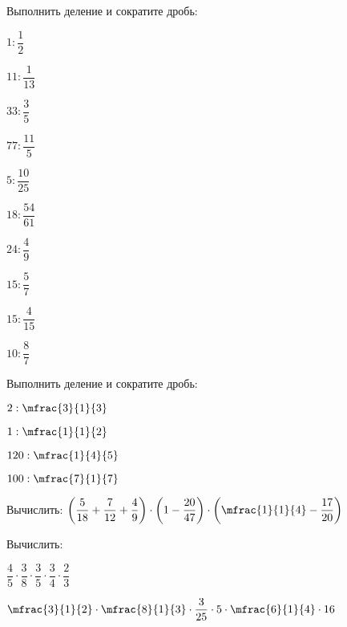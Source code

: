 \begin{listofex}[resume]
	\item Выполнить деление и сократите дробь:
	\begin{enumcols}[itemcolumns=5]
		\item \( 1:\dfrac{1}{2} \)
		\item \( 11:\dfrac{1}{13} \)
		\item \( 33:\dfrac{3}{5} \)
		\item \( 77:\dfrac{11}{5} \)
		\item \( 5:\dfrac{10}{25} \)
		\item \( 18:\dfrac{54}{61} \)
		\item \( 24:\dfrac{4}{9} \)
		\item \( 15:\dfrac{5}{7} \)
		\item \( 15:\dfrac{4}{15} \)
		\item \( 10:\dfrac{8}{7} \)
	\end{enumcols}
	\item Выполнить деление и сократите дробь:
	\begin{enumcols}[itemcolumns=4]
		\item \( 2:\mfrac{3}{1}{3} \)
		\item \( 1:\mfrac{1}{1}{2} \)
		\item \( 120:\mfrac{1}{4}{5} \)
		\item \( 100:\mfrac{7}{1}{7} \)
	\end{enumcols}
	\item Вычислить: \( \left( \dfrac{5}{18}+\dfrac{7}{12}+\dfrac{4}{9} \right)\cdot\left( 1-\dfrac{20}{47} \right)\cdot\left( \mfrac{1}{1}{4}-\dfrac{17}{20} \right) \)
	\item Вычислить:
	\begin{enumcols}[itemcolumns=5]
		\item \( \dfrac{4}{5}\cdot\dfrac{3}{8}\cdot\dfrac{3}{5}\cdot\dfrac{3}{4}\cdot\dfrac{2}{3}\)
		\item \( \mfrac{3}{1}{2}\cdot\mfrac{8}{1}{3}\cdot\dfrac{3}{25}\cdot5\cdot\mfrac{6}{1}{4}\cdot16 \)
	\end{enumcols}
\end{listofex}
%	
